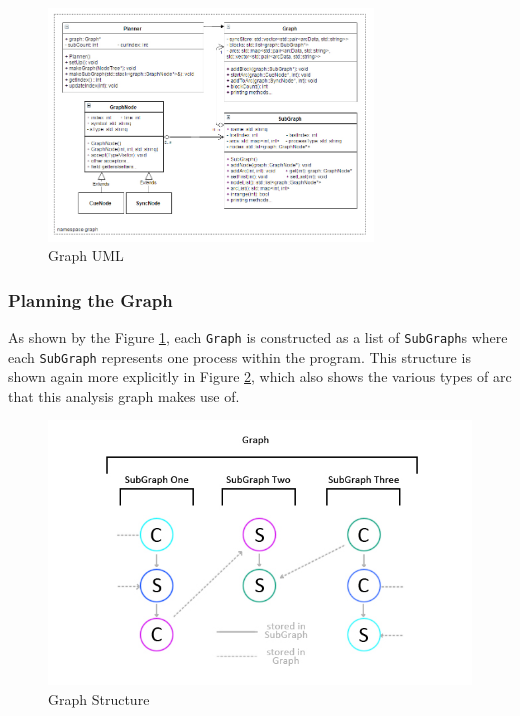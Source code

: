 \documentclass[11pt, abstracton, twoside, titlepage=true]{scrartcl}
\begin{document}
\begin{figure}[h!]
	\centering
	\includegraphics[width=0.77\textwidth]{images/session.jpg}
	\caption{Graph UML} \label{graphUML}
\end{figure}
\newpage

\subsubsection{Planning the Graph} \label{planningGraph}
As shown by the Figure \ref{graphUML}, each \texttt{Graph} is constructed as
a list of \texttt{SubGraph}s where each \texttt{SubGraph} represents
one process within the program. This structure is shown again more explicitly in 
Figure \ref{graphStructure}, which also shows the various types of arc that this 
analysis graph makes use of.

\begin{figure}[h!]
	\centering
	\includegraphics[width=\textwidth]{images/GSG.jpg}
	\caption{Graph Structure} \label{graphStructure}
\end{figure}
\end{document}
